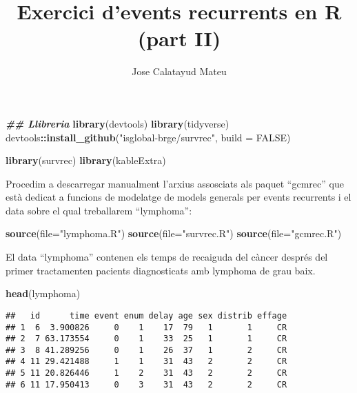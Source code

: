 \documentclass[
]{article}
\title{Exercici d'events recurrents en R (part II)}
\author{Jose Calatayud Mateu}
\date{}
\newenvironment{Shaded}{\begin{snugshade}}{\end{snugshade}}
\newcommand{\AttributeTok}[1]{\textcolor[rgb]{0.13,0.29,0.53}{#1}}
\newcommand{\ConstantTok}[1]{\textcolor[rgb]{0.56,0.35,0.01}{#1}}
\newcommand{\DocumentationTok}[1]{\textcolor[rgb]{0.56,0.35,0.01}{\textbf{\textit{#1}}}}
\newcommand{\FunctionTok}[1]{\textcolor[rgb]{0.13,0.29,0.53}{\textbf{#1}}}
\newcommand{\NormalTok}[1]{#1}
\newcommand{\SpecialCharTok}[1]{\textcolor[rgb]{0.81,0.36,0.00}{\textbf{#1}}}
\newcommand{\StringTok}[1]{\textcolor[rgb]{0.31,0.60,0.02}{#1}}
\begin{document}
\maketitle

\begin{Shaded}
\begin{Highlighting}[]
\DocumentationTok{\#\# Llibreria}
\FunctionTok{library}\NormalTok{(devtools)}
\FunctionTok{library}\NormalTok{(tidyverse)}
\NormalTok{devtools}\SpecialCharTok{::}\FunctionTok{install\_github}\NormalTok{(}\StringTok{"isglobal{-}brge/survrec"}\NormalTok{, }
                         \AttributeTok{build =} \ConstantTok{FALSE}\NormalTok{)}

\FunctionTok{library}\NormalTok{(survrec)}
\FunctionTok{library}\NormalTok{(kableExtra)}
\end{Highlighting}
\end{Shaded}

Procedim a descarregar manualment l'arxius assosciats als paquet
``gcmrec'' que està dedicat a funcions de modelatge de models generals
per events recurrents i el data sobre el qual treballarem ``lymphoma'':

\begin{Shaded}
\begin{Highlighting}[]
\FunctionTok{source}\NormalTok{(}\AttributeTok{file=}\StringTok{"lymphoma.R"}\NormalTok{)}
\FunctionTok{source}\NormalTok{(}\AttributeTok{file=}\StringTok{"survrec.R"}\NormalTok{)}
\FunctionTok{source}\NormalTok{(}\AttributeTok{file=}\StringTok{"gcmrec.R"}\NormalTok{)}
\end{Highlighting}
\end{Shaded}

El data ``lymphoma'' contenen els temps de recaiguda del càncer després
del primer tractamenten pacients diagnosticats amb lymphoma de grau
baix.

\begin{Shaded}
\begin{Highlighting}[]
\FunctionTok{head}\NormalTok{(lymphoma)}
\end{Highlighting}
\end{Shaded}

\begin{verbatim}
##   id      time event enum delay age sex distrib effage
## 1  6  3.900826     0    1    17  79   1       1     CR
## 2  7 63.173554     0    1    33  25   1       1     CR
## 3  8 41.289256     0    1    26  37   1       2     CR
## 4 11 29.421488     1    1    31  43   2       2     CR
## 5 11 20.826446     1    2    31  43   2       2     CR
## 6 11 17.950413     0    3    31  43   2       2     CR
\end{verbatim}
\end{document}
